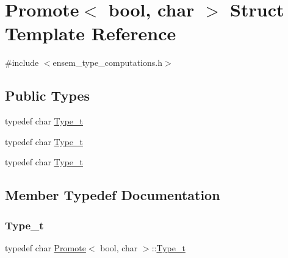 \hypertarget{structPromote_3_01bool_00_01char_01_4}{}\section{Promote$<$ bool, char $>$ Struct Template Reference}
\label{structPromote_3_01bool_00_01char_01_4}


{\ttfamily \#include $<$ensem\+\_\+type\+\_\+computations.\+h$>$}

\subsection*{Public Types}
\begin{DoxyCompactItemize}
\item 
typedef char \mbox{\hyperlink{structPromote_3_01bool_00_01char_01_4_ae241f014309954a164eb7d94f35e3adc}{Type\+\_\+t}}
\item 
typedef char \mbox{\hyperlink{structPromote_3_01bool_00_01char_01_4_ae241f014309954a164eb7d94f35e3adc}{Type\+\_\+t}}
\item 
typedef char \mbox{\hyperlink{structPromote_3_01bool_00_01char_01_4_ae241f014309954a164eb7d94f35e3adc}{Type\+\_\+t}}
\end{DoxyCompactItemize}


\subsection{Member Typedef Documentation}
\mbox{\label{structPromote_3_01bool_00_01char_01_4_ae241f014309954a164eb7d94f35e3adc}} 
\subsubsection{\texorpdfstring{Type\_t}{Type\_t}\hspace{0.1cm}{\footnotesize\ttfamily [1/3]}}
{\footnotesize\ttfamily typedef char \mbox{\hyperlink{structPromote}{Promote}}$<$ bool, char $>$\+::\mbox{\hyperlink{structPromote_3_01bool_00_01char_01_4_ae241f014309954a164eb7d94f35e3adc}{Type\+\_\+t}}}

\mbox{\label{structPromote_3_01bool_00_01char_01_4_ae241f014309954a164eb7d94f35e3adc}} 
